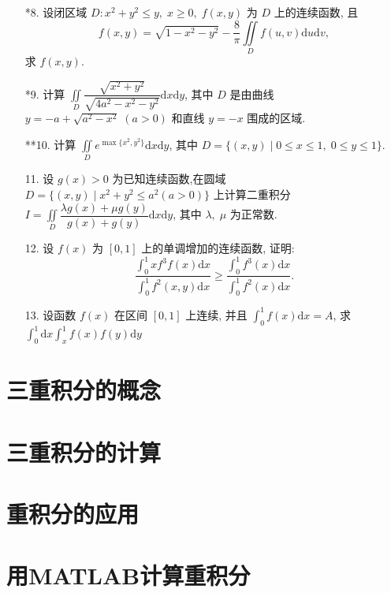 \begin{enumerate}
    \item[*8.] 设闭区域 $D : x^2+y^2\leqslant y,\;x\geqslant 0,\;f(x, y)$ 为 $D$ 上的连续函数, 且
    \[
        f(x, y)=\sqrt{1-x^2-y^2}-\dfrac{8}{\pi}\iint\limits_{D}f(u, v)\text{d}u\text{d}v,
    \]
    求 $f(x, y)$.

    \item[*9.] 计算 $\displaystyle \iint\limits_{D}\dfrac{\sqrt{x^2+y^2}}{\sqrt{4a^2-x^2-y^2}}\text{d}x\text{d}y$, 其中 $D$ 是由曲线 $y=-a+\sqrt{a^2-x^2}\;(a>0)$ 和直线 $y=-x$ 围成的区域.
    
    \item[**10.] 计算 $\displaystyle\iint\limits_{D}e^{\max\{x^2, y^2\}}\text{d}x\text{d}y$, 其中 $D=\{(x, y) \mid 0\leqslant x\leqslant 1,\;0\leqslant y\leqslant 1\}$.
    
    \item[11.] 设 $g(x)>0$ 为已知连续函数,在圆域 $D=\{(x, y) \mid x^2+y^2\leqslant a^2(a>0)\}$ 上计算二重积分 $\displaystyle I=\iint\limits_{D}\dfrac{\lambda g(x)+\mu g(y)}{g(x)+g(y)}\text{d}x\text{d}y$, 其中 $\lambda,\;\mu$ 为正常数.
    
    \item[12.] 设 $f(x)$ 为 $[0, 1]$ 上的单调增加的连续函数, 证明:
    \[
        \dfrac{\displaystyle\int_0^1xf^3f(x)\text{d}x}{\displaystyle\int_0^1f^2(x, y)\text{d}x}\geqslant \dfrac{\displaystyle\int_0^1f^3(x)\text{d}x}{\displaystyle\int_0^1f^2(x)\text{d}x}.
    \]

    \item[13.] 设函数 $f(x)$ 在区间 $[0, 1]$ 上连续, 并且 $\displaystyle\int_0^1f(x)\text{d}x=A$, 求 $\displaystyle\int_0^1\text{d}x\int_x^1f(x)f(y)\text{d}y$
\end{enumerate}


\section{三重积分的概念}



\section{三重积分的计算}



\section{重积分的应用}



\section{用MATLAB计算重积分}

